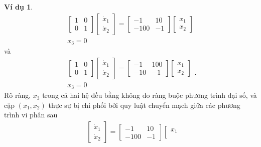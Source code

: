 \documentclass[12pt,a4paper]{report}
\theoremstyle{definition}
\newtheorem{vd}{Ví dụ}
\theoremstyle{definition}
\numberwithin{dl}{chapter}
\numberwithin{vd}{chapter}
\numberwithin{corollary}{chapter}
\numberwithin{lemma}{chapter}
\numberwithin{md}{chapter}
\numberwithin{dn}{chapter}
\numberwithin{cy}{chapter}
\numberwithin{nx}{chapter}
\begin{document}
\begin{vd}
$$
\begin{array} { l } 
{ {\left[\begin{array}{cc}
1 & 0 \\
0 & 1 
\end{array}\right] }{\left[\begin{array}{cc}
\dot{x} _ { 1 } \\
\dot{x} _ { 2 }
\end{array}\right] } = {\left[\begin{array}{cc}
-1 & 10 \\
-100 & -1 
\end{array}\right] } } {\left[\begin{array}{cc}
x _ { 1 } \\
x _ { 2 }
\end{array}\right] }\\
{ x _ { 3 } = 0 }
\end{array}
$$
và
$$
\begin{array} { l } 
{ {\left[\begin{array}{cc}
1 & 0 \\
0 & 1 
\end{array}\right] }{\left[\begin{array}{cc}
\dot{x} _ { 1 } \\
\dot{x} _ { 2 }
\end{array}\right] } = {\left[\begin{array}{cc}
-1 & 100 \\
-10 & -1 
\end{array}\right] } } {\left[\begin{array}{cc}
x _ { 1 } \\
x _ { 2 }
\end{array}\right] }\\
{ x _ { 3 } = 0 }
\end{array}.
$$
Rõ ràng, $x_{3}$ trong cả hai hệ đều bằng không do ràng buộc phương trình đại số, và cặp  $\left(x_{1}, x_{2}\right)$ thực sự bị chi phối bởi quy luật chuyển mạch giữa các phương trình vi phân sau
$$
\begin{aligned}
&{\left[\begin{array}{l}
\dot{x}_{1} \\
\dot{x}_{2}
\end{array}\right]=\left[\begin{array}{cc}
-1 & 10 \\
-100 & -1
\end{array}\right]\left[\begin{array}{l}
x_{1} \\

\end{array}}
\end{aligned}$$
\end{vd}
\end{document}
